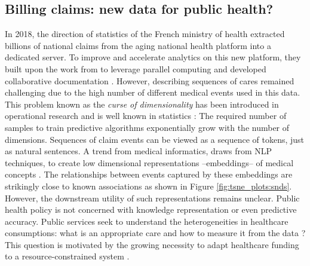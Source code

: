\documentclass[french,12pt,twoside,a4paper]{book}
\begin{document}
\subsection{Billing claims: new data for public health?}
%
In 2018, the direction of statistics of the French ministry of health extracted
billions of national claims from the aging national health platform into a
dedicated server.
%
To improve and accelerate analytics on this new platform, they built upon the
work from \cite{bacry2020scalpel3} to leverage parallel computing and developed
collaborative documentation \citep{documentation_snds}. However, describing
sequences of cares remained challenging due to the high number of different
medical events used in this data. This problem known as the \emph{curse of
  dimensionality} has been introduced in operational research
\citep{bellman1957dynamic} and is well known in statistics
\citep{breiman2001statistical}: The required number of samples to train
predictive algorithms exponentially grow with the number of dimensions.%
Sequences of claim events can be viewed as a sequence of tokens, just as natural
sentences. A trend from medical informatics, draws from NLP techniques, to
create low dimensional representations --embeddings-- of medical concepts
\citep{beam2019clinical}. The relationships between events captured by these
embeddings are strikingly close to known associations as shown in Figure
\ref{fig:tsne_plots:snds}. However, the downstream utility of such
representations remains unclear. Public health policy is not concerned with
knowledge representation or even predictive accuracy. Public services seek to
understand the heterogeneities in healthcare consumptions: what is an
appropriate care and how to measure it from the data
\citep{cma_policy_appropriateness_2015}? This question is motivated by the
growing necessity to adapt healthcare funding to a resource-constrained system
\citep{mcginnis2013best,aubert_2019}.


\end{document}
